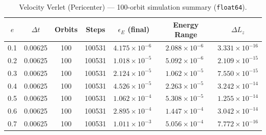 \documentclass[twocolumn, 10pt]{article}
\begin{document}
\begin{table}[htbp]
\centering
\caption{Velocity Verlet (Pericenter) --- 100-orbit simulation summary (\texttt{float64}).}
\label{tab:verlet_peri}
\begin{tabular}{@{}ccccccc@{}}
\toprule
$e$ & $\Delta t$ & Orbits & Steps & $\epsilon_E$ (final) & Energy Range & $\Delta L_z$ \\
\midrule
0.1 & 0.00625 & 100 & 100531 & $4.175 \times 10^{-6\phantom{0}}$ & $2.088 \times 10^{-6\phantom{0}}$ & $3.331 \times 10^{-16}$ \\
0.2 & 0.00625 & 100 & 100531 & $1.018 \times 10^{-5\phantom{0}}$ & $5.092 \times 10^{-6\phantom{0}}$ & $2.109 \times 10^{-15}$ \\
0.3 & 0.00625 & 100 & 100531 & $2.124 \times 10^{-5\phantom{0}}$ & $1.062 \times 10^{-5\phantom{0}}$ & $7.550 \times 10^{-15}$ \\
0.4 & 0.00625 & 100 & 100531 & $4.526 \times 10^{-5\phantom{0}}$ & $2.263 \times 10^{-5\phantom{0}}$ & $3.242 \times 10^{-14}$ \\
0.5 & 0.00625 & 100 & 100531 & $1.062 \times 10^{-4\phantom{0}}$ & $5.308 \times 10^{-5\phantom{0}}$ & $1.255 \times 10^{-14}$ \\
0.6 & 0.00625 & 100 & 100531 & $2.895 \times 10^{-4\phantom{0}}$ & $1.447 \times 10^{-4\phantom{0}}$ & $3.042 \times 10^{-14}$ \\
0.7 & 0.00625 & 100 & 100531 & $1.011 \times 10^{-3\phantom{0}}$ & $5.056 \times 10^{-4\phantom{0}}$ & $7.772 \times 10^{-16}$ \\
\bottomrule
\end{tabular}
\end{table}
\end{document}
